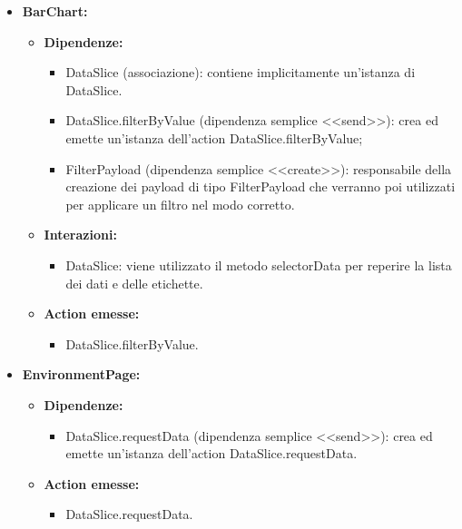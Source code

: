 \begin{itemize}
      \item \textbf{BarChart:}
            \begin{itemize}
                  \item \textbf{Dipendenze:}
                        \begin{itemize}
                              \item DataSlice (associazione): contiene implicitamente un'istanza di DataSlice.
                              \item DataSlice.filterByValue (dipendenza semplice <<send>>): crea ed emette
                                    un'istanza dell'action DataSlice.filterByValue;
                              \item FilterPayload (dipendenza semplice <<create>>): responsabile della creazione
                                    dei payload di tipo FilterPayload che verranno poi utilizzati per applicare un
                                    filtro nel modo corretto.
                        \end{itemize}
                  \item \textbf{Interazioni:}
                        \begin{itemize}
                              \item DataSlice: viene utilizzato il metodo selectorData per reperire la lista dei
                                    dati e delle etichette.
                        \end{itemize}
                  \item \textbf{Action emesse:}
                        \begin{itemize}
                              \item DataSlice.filterByValue.
                        \end{itemize}
            \end{itemize}

      \item \textbf{EnvironmentPage:}
            \begin{itemize}
                  \item \textbf{Dipendenze:}
                        \begin{itemize}
                              \item DataSlice.requestData (dipendenza semplice <<send>>): crea ed emette un'istanza
                                    dell'action DataSlice.requestData.
                        \end{itemize}
                  \item \textbf{Action emesse:}
                        \begin{itemize}
                              \item DataSlice.requestData.
                        \end{itemize}
            \end{itemize}


\end{itemize}
